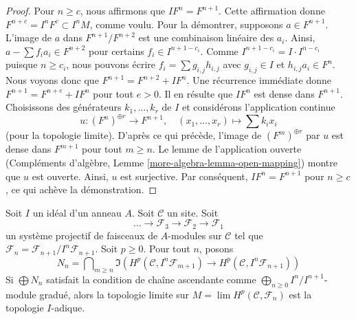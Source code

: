\begin{proof}
\medskip\noindent
Pour $n \geq c$, nous affirmons que $I F^n = F^{n + 1}$. Cette
affirmation donne $F^{n + c} = I^nF^c \subset I^nM$, comme voulu. Pour la
démontrer, supposons $a \in F^{n + 1}$. L'image de $a$ dans
$F^{n + 1}/F^{n + 2}$ est une combinaison linéaire des $a_i$. Ainsi,
$a  - \sum f_i a_i \in F^{n + 2}$ pour certains
$f_i \in I^{n + 1 - c_i}$. Comme
$I^{n + 1 - c_i} = I \cdot I^{n - c_i}$ puisque $n \geq c_i$, nous
pouvons écrire $f_i = \sum g_{i, j} h_{i, j}$ avec $g_{i, j} \in I$ et
$h_{i, j}a_i \in F^n$. Nous voyons donc que
$F^{n + 1} = F^{n + 2} + IF^n$. Une récurrence immédiate donne
$F^{n + 1} = F^{n + e} + IF^n$ pour tout $e > 0$. Il en résulte que
$IF^n$ est dense dans $F^{n + 1}$. Choisissons des générateurs
$k_1, \ldots, k_r$ de $I$ et considérons l'application continue
$$
u : (F^n)^{\oplus r} \longrightarrow F^{n + 1},\quad
(x_1, \ldots, x_r) \mapsto \sum k_i x_i
$$
(pour la topologie limite). D'après ce qui précède, l'image de
$(F^m)^{\oplus r}$ par $u$ est dense dans $F^{m + 1}$ pour tout
$m \geq n$. Le lemme de l'application ouverte (Compléments d'algèbre,
Lemme \ref{more-algebra-lemma-open-mapping}) montre que $u$ est ouverte.
Ainsi, $u$ est surjective. Par conséquent, $IF^n = F^{n + 1}$ pour
$n \geq c$, ce
qui achève la démonstration.
\end{proof}

\begin{lemma}
\label{lemma-topology-I-adic-general-better}
Soit $I$ un idéal d'un anneau $A$. Soit $\mathcal{C}$ un site. Soit
$$
\ldots \to \mathcal{F}_3 \to \mathcal{F}_2 \to \mathcal{F}_1
$$
un système projectif de faisceaux de $A$-modules sur $\mathcal{C}$ tel que
$\mathcal{F}_n = \mathcal{F}_{n + 1}/I^n\mathcal{F}_{n + 1}$. Soit
$p \geq 0$. Pour tout $n$, posons
$$
N_n =
\bigcap\nolimits_{m \geq n}
\Im\left(
H^p(\mathcal{C}, I^n\mathcal{F}_{m + 1}) \to
H^p(\mathcal{C}, I^n\mathcal{F}_{n + 1})
\right)
$$
Si $\bigoplus N_n$ satisfait la condition de chaîne ascendante comme
$\bigoplus_{n \geq 0} I^n/I^{n + 1}$-module gradué, alors la topologie
limite sur $M = \lim H^p(\mathcal{C}, \mathcal{F}_n)$ est la topologie
$I$-adique.
\end{lemma}

